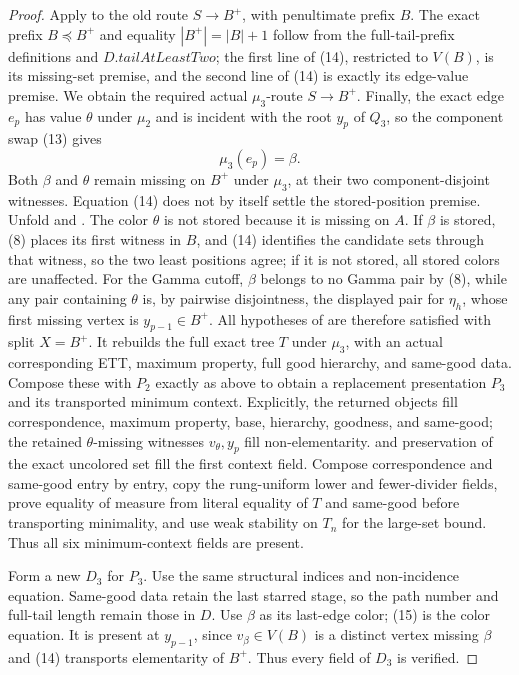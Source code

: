 \begin{proof}
Apply  to the
old route \(S\longrightarrow B^+\), with penultimate prefix \(B\).  The
exact prefix \(B\preccurlyeq B^+\) and equality
\(|B^+|=|B|+1\) follow from the full-tail-prefix definitions and
\(D.\mathit{tailAtLeastTwo}\); the first line of (14), restricted to
\(V(B)\), is its missing-set premise, and the second line of (14) is
exactly its edge-value premise.  We obtain the required actual
\(\mu_3\)-route \(S\longrightarrow B^+\).  Finally, the exact edge
\(e_p\) has value \(\theta\) under \(\mu_2\) and is incident with the
root \(y_p\) of \(Q_3\), so the component swap (13) gives
\[
                    \mu_3(e_p)=\beta.                         \tag{15}
\]
Both \(\beta\) and \(\theta\) remain missing on \(B^+\) under
\(\mu_3\), at their two component-disjoint witnesses.  Equation (14)
does not by itself settle the stored-position premise.  Unfold
 and
.  The color \(\theta\) is not
stored because it is missing on \(A\).  If \(\beta\) is stored, (8)
places its first witness in \(B\), and (14) identifies the candidate
sets through that witness, so the two least positions agree; if it is
not stored, all stored colors are unaffected.  For the Gamma cutoff, \(\beta\)
belongs to no Gamma pair by (8), while any pair containing \(\theta\)
is, by pairwise disjointness, the displayed pair for \(\eta_h\), whose
first missing vertex is \(y_{p-1}\in B^+\).  All hypotheses of
 are therefore satisfied with
split \(X=B^+\).  It rebuilds the full exact tree \(T\) under \(\mu_3\),
with an actual corresponding ETT, maximum property, full good hierarchy,
and same-good data.  Compose these with \(P_2\) exactly as above to
obtain a replacement presentation \(P_3\) and its transported minimum
context.  Explicitly, the returned objects fill correspondence, maximum
property, base, hierarchy, goodness, and same-good; the retained
\(\theta\)-missing witnesses \(v_\theta,y_p\) fill non-elementarity.
 and preservation of the exact
uncolored set fill the first context field.  Compose correspondence and
same-good entry by entry, copy the rung-uniform lower and fewer-divider
fields, prove equality of measure from literal equality of \(T\) and
same-good before transporting minimality, and use weak stability on
\(T_n\) for the large-set bound.  Thus all six minimum-context fields
are present.

Form a new  \(D_3\) for \(P_3\).
Use the same structural indices and non-incidence equation.  Same-good
data retain the last starred stage, so the path number and full-tail
length remain those in \(D\).  Use \(\beta\) as its last-edge color;
(15) is the color equation.  It is present at \(y_{p-1}\), since
\(v_\beta\in V(B)\) is a distinct vertex missing \(\beta\) and (14)
transports elementarity of \(B^+\).  Thus every field of \(D_3\) is
verified.


\end{proof}
